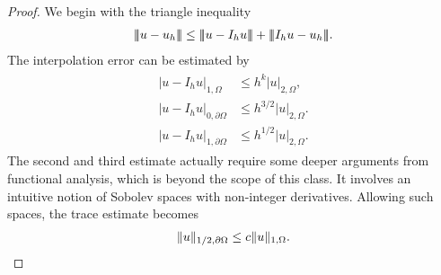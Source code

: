 \begin{proof}
  We begin with the triangle inequality
  \begin{gather*}
    \tnorm{u-u_h} \le \tnorm{u-I_h u} + \tnorm{I_h u-u_h}.
  \end{gather*}
  The interpolation error can be estimated by
  \begin{gather}
    \label{eq:nitsche:7}
    \begin{split}
      \left| u-I_h u\right|_{1,\Omega}
      &\le h^k \left|u\right|_{2,\Omega},
      \\
      \left| u-I_h u\right|_{0,\partial\Omega}
      & \le h^{3/2} \left|u\right|_{2,\Omega}.
      \\
      \left| u-I_h u\right|_{1,\partial\Omega}
      & \le h^{1/2} \left|u\right|_{2,\Omega}.
    \end{split}
  \end{gather}
  The second and third estimate actually require some deeper arguments from
  functional analysis, which is beyond the scope of this class. It
  involves an intuitive notion of Sobolev spaces with non-integer
  derivatives. Allowing such spaces, the trace estimate becomes
  \begin{gather}
    \lVert u\rVert_{1/2, \partial\Omega} \le c \lVert u\rVert_{1,\Omega}.
  \end{gather}


\end{proof}
